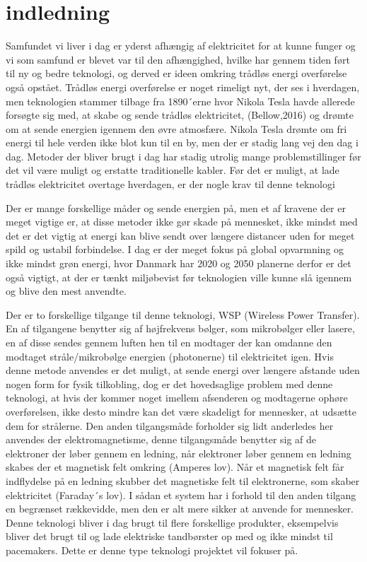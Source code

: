 \chapter{indledning}
Samfundet vi liver i dag er yderst afhængig af elektricitet for at kunne funger og vi som samfund er blevet var til den afhængighed, hvilke har gennem tiden ført til ny og bedre teknologi, og derved er ideen omkring trådløs energi overførelse også opstået. Trådløs energi overførelse er noget rimeligt nyt, der ses i hverdagen, men teknologien stammer tilbage fra 1890´erne hvor Nikola Tesla havde allerede forsøgte sig med, at skabe og sende trådløs elektricitet, (Bellow,2016) og drømte om at sende energien igennem den øvre atmosfære. Nikola Tesla drømte om fri energi til hele verden ikke blot kun til en by, men der er stadig lang vej den dag i dag. Metoder der bliver brugt i dag har stadig utrolig mange problemstillinger før det vil være muligt og erstatte traditionelle kabler. Før det er muligt, at lade trådløs elektricitet overtage hverdagen, er der nogle krav til denne teknologi 

Der er mange forskellige måder og sende energien på, men et af kravene der er meget vigtige er, at disse metoder ikke gør skade på mennesket, ikke mindst med det er det vigtig at energi kan blive sendt over længere distancer uden for meget spild og ustabil forbindelse. I dag er der meget fokus på global opvarmning og ikke mindst grøn energi, hvor Danmark har 2020 og 2050 planerne derfor er det også vigtigt, at der er tænkt miljøbevist før teknologien ville kunne slå igennem og blive den mest anvendte.

Der er to forskellige tilgange til denne teknologi, WSP (Wireless Power Transfer). En af tilgangene benytter sig af højfrekvens bølger, som mikrobølger eller lasere, en af disse sendes gennem luften hen til en modtager der kan omdanne den modtaget stråle/mikrobølge energien (photonerne) til elektricitet igen. Hvis denne metode anvendes er det muligt, at sende energi over længere afstande uden nogen form for fysik tilkobling, dog er det hovedsaglige problem med denne teknologi, at hvis der kommer noget imellem afsenderen og modtagerne ophøre overførelsen, ikke desto mindre kan det være skadeligt for mennesker, at udsætte dem for strålerne. Den anden tilgangsmåde forholder sig lidt anderledes her anvendes der elektromagnetisme, denne tilgangsmåde benytter sig af de elektroner der løber gennem en ledning, når elektroner løber gennem en ledning skabes der et magnetisk felt omkring (Amperes lov).  Når et magnetisk felt får indflydelse på en ledning skubber det magnetiske felt  til elektronerne, som skaber elektricitet (Faraday´s lov). I sådan et system har i forhold til den anden tilgang en begrænset rækkevidde, men den er alt mere sikker at anvende for mennesker. Denne teknologi bliver i dag brugt til flere forskellige produkter, eksempelvis bliver det brugt til og lade elektriske tandbørster op med og ikke mindst til pacemakers. Dette er denne type teknologi projektet vil fokuser på. 
